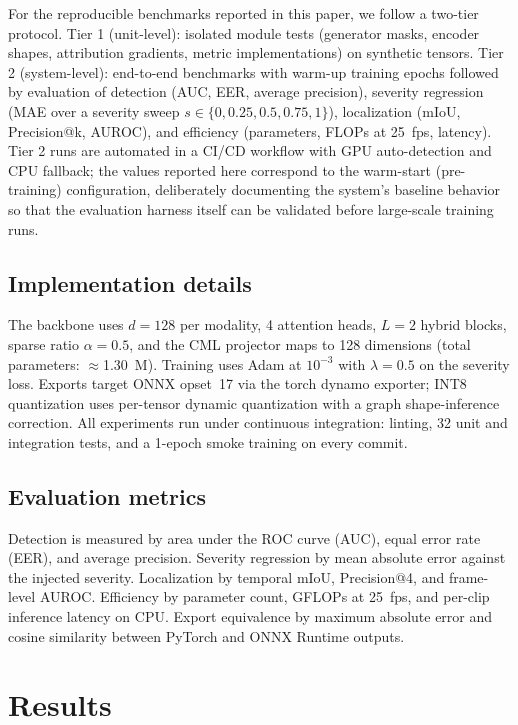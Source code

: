 \documentclass[sn-basic,Numbered,referee]{sn-jnl}
\begin{document}
For the reproducible benchmarks reported in this paper, we follow a two-tier protocol. Tier 1 (unit-level): isolated module tests (generator masks, encoder shapes, attribution gradients, metric implementations) on synthetic tensors. Tier 2 (system-level): end-to-end benchmarks with warm-up training epochs followed by evaluation of detection (AUC, EER, average precision), severity regression (MAE over a severity sweep $s \in \{0, 0.25, 0.5, 0.75, 1\}$), localization (mIoU, Precision@k, AUROC), and efficiency (parameters, FLOPs at 25~fps, latency). Tier 2 runs are automated in a CI/CD workflow with GPU auto-detection and CPU fallback; the values reported here correspond to the warm-start (pre-training) configuration, deliberately documenting the system's baseline behavior so that the evaluation harness itself can be validated before large-scale training runs.

\subsection{Implementation details}

The backbone uses $d = 128$ per modality, 4 attention heads, $L = 2$ hybrid blocks, sparse ratio $\alpha = 0.5$, and the CML projector maps to 128 dimensions (total parameters: $\approx$1.30~M). Training uses Adam at $10^{-3}$ with $\lambda = 0.5$ on the severity loss. Exports target ONNX opset~17 via the torch dynamo exporter; INT8 quantization uses per-tensor dynamic quantization with a graph shape-inference correction. All experiments run under continuous integration: linting, 32 unit and integration tests, and a 1-epoch smoke training on every commit.

\subsection{Evaluation metrics}

Detection is measured by area under the ROC curve (AUC), equal error rate (EER), and average precision. Severity regression by mean absolute error against the injected severity. Localization by temporal mIoU, Precision@4, and frame-level AUROC. Efficiency by parameter count, GFLOPs at 25~fps, and per-clip inference latency on CPU. Export equivalence by maximum absolute error and cosine similarity between PyTorch and ONNX Runtime outputs.

\section{Results}
\label{sec:results}
\end{document}
